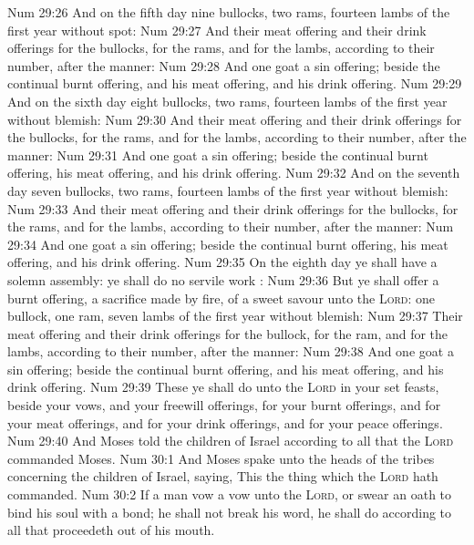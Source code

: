 \vs Num 29:26 And on the fifth day nine bullocks, two rams,  fourteen lambs of the first year without spot:
\vs Num 29:27 And their meat offering and their drink offerings for the bullocks, for the rams, and for the lambs,  according to their number, after the manner:
\vs Num 29:28 And one goat  a sin offering; beside the continual burnt offering, and his meat offering, and his drink offering.
\vs Num 29:29 And on the sixth day eight bullocks, two rams,  fourteen lambs of the first year without blemish:
\vs Num 29:30 And their meat offering and their drink offerings for the bullocks, for the rams, and for the lambs,  according to their number, after the manner:
\vs Num 29:31 And one goat  a sin offering; beside the continual burnt offering, his meat offering, and his drink offering.
\vs Num 29:32 And on the seventh day seven bullocks, two rams,  fourteen lambs of the first year without blemish:
\vs Num 29:33 And their meat offering and their drink offerings for the bullocks, for the rams, and for the lambs,  according to their number, after the manner:
\vs Num 29:34 And one goat  a sin offering; beside the continual burnt offering, his meat offering, and his drink offering.
\vs Num 29:35 On the eighth day ye shall have a solemn assembly: ye shall do no servile work :
\vs Num 29:36 But ye shall offer a burnt offering, a sacrifice made by fire, of a sweet savour unto the \textsc{Lord}: one bullock, one ram, seven lambs of the first year without blemish:
\vs Num 29:37 Their meat offering and their drink offerings for the bullock, for the ram, and for the lambs,  according to their number, after the manner:
\vs Num 29:38 And one goat  a sin offering; beside the continual burnt offering, and his meat offering, and his drink offering.
\vs Num 29:39 These  ye shall do unto the \textsc{Lord} in your set feasts, beside your vows, and your freewill offerings, for your burnt offerings, and for your meat offerings, and for your drink offerings, and for your peace offerings.
\vs Num 29:40 And Moses told the children of Israel according to all that the \textsc{Lord} commanded Moses.
\vs Num 30:1 And Moses spake unto the heads of the tribes concerning the children of Israel, saying, This  the thing which the \textsc{Lord} hath commanded.
\vs Num 30:2 If a man vow a vow unto the \textsc{Lord}, or swear an oath to bind his soul with a bond; he shall not break his word, he shall do according to all that proceedeth out of his mouth.
